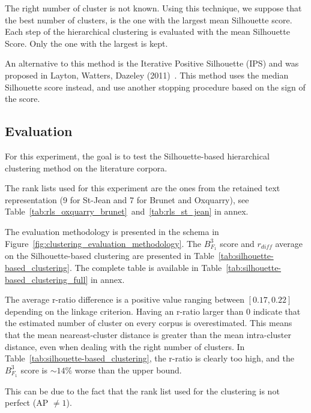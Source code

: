 The right number of cluster is not known.
Using this technique, we suppose that the best number of clusters, is the one with the largest mean Silhouette score.
Each step of the hierarchical clustering is evaluated with the mean Silhouette Score.
Only the one with the largest is kept.

An alternative to this method is the Iterative Positive Silhouette (IPS) and was proposed in Layton, Watters, Dazeley (2011)~\cite{automated_unsupervised}.
This method uses the median Silhouette score instead, and use another stopping procedure based on the sign of the score.

\subsection{Evaluation}

For this experiment, the goal is to test the Silhouette-based hierarchical clustering method on the literature corpora.

The rank lists used for this experiment are the ones from the retained text representation (9 for St-Jean and 7 for Brunet and Oxquarry), see Table~\ref{tab:rls_oxquarry_brunet}~and~\ref{tab:rls_st_jean} in annex.

The evaluation methodology is presented in the schema in Figure~\ref{fig:clustering_evaluation_methodology}.
The $B^3_{F_1}$ score and $r_{diff}$ average on the Silhouette-based clustering are presented in Table~\ref{tab:silhouette-based_clustering}.
The complete table is available in Table~\ref{tab:silhouette-based_clustering_full} in annex.

The average r-ratio difference is a positive value ranging between $\left[0.17, 0.22\right]$ depending on the linkage criterion.
Having an r-ratio larger than $0$ indicate that the estimated number of cluster on every corpus is overestimated.
This means that the mean neareast-cluster distance is greater than the mean intra-cluster distance, even when dealing with the right number of clusters.
In Table~\ref{tab:silhouette-based_clustering}, the r-ratio is clearly too high, and the $B^3_{F_1}$ score is $\sim 14\%$ worse than the upper bound.

This can be due to the fact that the rank list used for the clustering is not perfect (AP $\neq 1$).

